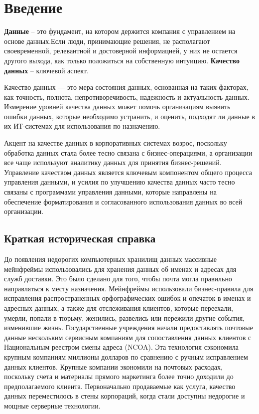 \documentclass{article}
\begin{document}
\newpage

\section{Введение}

\textbf{Данные} – это фундамент, на котором держится компания с управлением на основе данных.Если люди, принимающие решения, не располагают своевременной, релевантной и достоверной информацией, у них не остается другого выхода, как только положиться на собственную интуицию. \textbf{Качество данных} – ключевой аспект.

Качество данных — это мера состояния данных, основанная на таких факторах, как точность, полнота, непротиворечивость, надежность и актуальность данных. Измерение уровней качества данных может помочь организациям выявить ошибки данных, которые необходимо устранить, и оценить, подходят ли данные в их ИТ-системах для использования по назначению.

Акцент на качестве данных в корпоративных системах возрос, поскольку обработка данных стала более тесно связана с бизнес-операциями, а организации все чаще используют аналитику данных для принятия бизнес-решений. Управление качеством данных является ключевым компонентом общего процесса управления данными, и усилия по улучшению качества данных часто тесно связаны с программами управления данными, которые направлены на обеспечение форматирования и согласованного использования данных во всей организации.

\subsection{Краткая историческая справка}
До появления недорогих компьютерных хранилищ данных массивные мейнфреймы использовались для хранения данных об именах и адресах для служб доставки. Это было сделано для того, чтобы почта могла правильно направляться к месту назначения. Мейнфреймы использовали бизнес-правила для исправления распространенных орфографических ошибок и опечаток в именах и адресных данных, а также для отслеживания клиентов, которые переехали, умерли, попали в тюрьму, женились, развелись или пережили другие события, изменившие жизнь. Государственные учреждения начали предоставлять почтовые данные нескольким сервисным компаниям для сопоставления данных клиентов с Национальным реестром смены адреса (NCOA). Эта технология сэкономила крупным компаниям миллионы долларов по сравнению с ручным исправлением данных клиентов. Крупные компании экономили на почтовых расходах, поскольку счета и материалы прямого маркетинга более точно доходили до предполагаемого клиента. Первоначально продаваемые как услуга, качество данных переместилось в стены корпораций, когда стали доступны недорогие и мощные серверные технологии.
\end{document}
